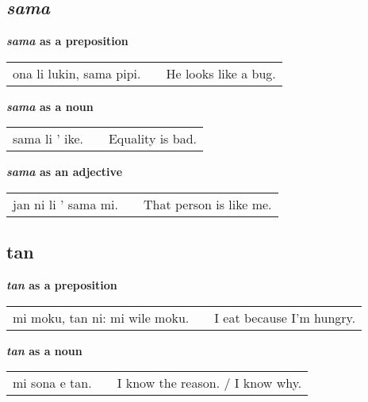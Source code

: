 \subsection*{\textit{sama}}
%
\textbf{\textit{sama} as a preposition} 

\begin{supertabular}{p{5,5cm}|ll}
ona li lukin, sama pipi. && He looks like a bug. \\
\end{supertabular} 

\textbf{\textit{sama} as a noun}

\begin{supertabular}{p{5,5cm}|ll}
sama li ' ike. && Equality is bad. \\
\end{supertabular} 

\textbf{\textit{sama} as an adjective}

\begin{supertabular}{p{5,5cm}|ll}
jan ni li ' sama mi. && That person is like me. \\
\end{supertabular} 
%
\subsection*{tan}
\textbf{\textit{tan} as a preposition} 

\begin{supertabular}{p{5,5cm}|ll}
mi moku, tan ni: mi wile moku. &&  I eat because I'm hungry. \\
\end{supertabular} 

\textbf{\textit{tan} as a noun}

\begin{supertabular}{p{5,5cm}|ll}
mi sona e tan. && I know the reason. / I know why. \\
\end{supertabular} 
%
%

